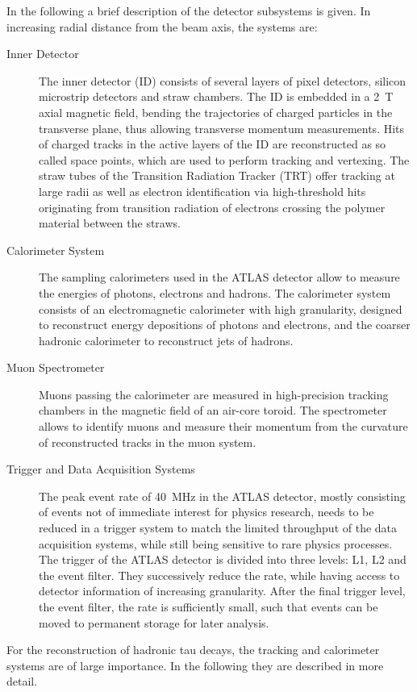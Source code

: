 In the following a brief description of the detector subsystems is given. In
increasing radial distance from the beam axis, the systems are:
\begin{description}
\item[Inner Detector] The inner detector (ID) consists of several layers of
  pixel detectors, silicon microstrip detectors and straw chambers. The ID is
  embedded in a \SI{2}{\tesla} axial magnetic field, bending the trajectories of
  charged particles in the transverse plane, thus allowing transverse momentum
  measurements. Hits of charged tracks in the active layers of the ID are
  reconstructed as so called space points, which are used to perform tracking
  and vertexing. The straw tubes of the Transition Radiation Tracker (TRT) offer
  tracking at large radii as well as electron identification via high-threshold
  hits originating from transition radiation of electrons crossing the polymer
  material between the straws.

\item[Calorimeter System] The sampling calorimeters used in the ATLAS detector
  allow to measure the energies of photons, electrons and hadrons. The
  calorimeter system consists of an electromagnetic calorimeter with high
  granularity, designed to reconstruct energy depositions of photons and
  electrons, and the coarser hadronic calorimeter to reconstruct jets of
  hadrons.

\item[Muon Spectrometer] Muons passing the calorimeter are measured in
  high-precision tracking chambers in the magnetic field of an air-core toroid.
  The spectrometer allows to identify muons and measure their momentum from the
  curvature of reconstructed tracks in the muon system.

\item[Trigger and Data Acquisition Systems] The peak event rate of
  \SI{40}{\mega\hertz} in the ATLAS detector, mostly consisting of events not of
  immediate interest for physics research, needs to be reduced in a trigger
  system to match the limited throughput of the data acquisition systems, while
  still being sensitive to rare physics processes. The trigger of the ATLAS
  detector is divided into three levels: L1, L2 and the event filter. They
  successively reduce the rate, while having access to detector information of
  increasing granularity. After the final trigger level, the event filter, the
  rate is sufficiently small, such that events can be moved to permanent storage
  for later analysis.
\end{description}
For the reconstruction of hadronic tau decays, the tracking and calorimeter
systems are of large importance. In the following they are described in more
detail.

